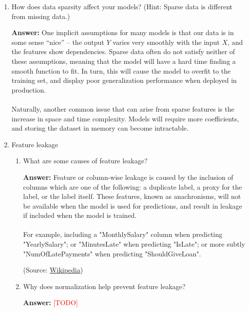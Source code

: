 \documentclass{article}
\newenvironment{QandA}{\begin{enumerate}[label=\arabic*.]}{\end{enumerate}}
\newenvironment{InnerQandA}{\begin{enumerate}[label=\roman*.]}{\end{enumerate}}
\newenvironment{answer}{\par\normalfont \textbf{Answer:}}{}
\newcommand{\todo}{\textcolor{red}{[TODO]}}
\begin{document}
\begin{QandA}
    \item How does data sparsity affect your models? (Hint: Sparse data is different from missing data.)
    \begin{answer}
        One implicit assumptions for many models is that our data is in some sense ``nice'' -- the output $Y$ varies very smoothly with the input $X$, and the features show dependencies. Sparse data often do not satisfy neither of these assumptions, meaning that the model will have a hard time finding a smooth function to fit. In turn, this will cause the model to overfit to the training set, and display poor generalization performance when deployed in production. \\\\
        Naturally, another common issue that can arise from  sparse features is the increase in space and time complexity. Models will require more coefficients, and storing the dataset in memory can become intractable. 
    \end{answer}

    \item Feature leakage
    \begin{InnerQandA}
        \item What are some causes of feature leakage?
        \begin{answer}
            Feature or column-wise leakage is caused by the inclusion of columns which are one of the following: a duplicate label, a proxy for the label, or the label itself. These features, known as anachronisms, will not be available when the model is used for predictions, and result in leakage if included when the model is trained. \\\\
            For example, including a "MonthlySalary" column when predicting "YearlySalary"; or "MinutesLate" when predicting "IsLate"; or more subtly "NumOfLatePayments" when predicting "ShouldGiveLoan".

            (Source: \href{https://en.wikipedia.org/wiki/Leakage_(machine_learning)}{Wikipedia})
        \end{answer}

        \item Why does normalization help prevent feature leakage?
        \begin{answer}
            \todo 
        \end{answer}


\end{InnerQandA}
\end{QandA}
\end{document}
